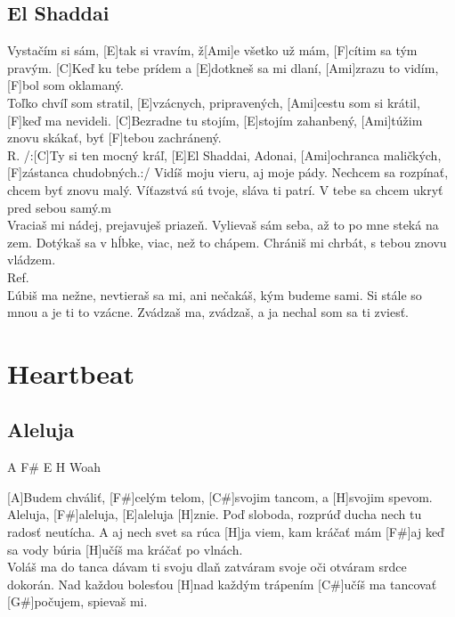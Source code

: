 \documentclass[10pt]{article}
\begin{document}
\begin{Large}
\begin{minipage}{\textwidth}
\subsection{El Shaddai}
\begin{multicols*}{2}
\begin{guitar}
	[C]Vystačím si sám, [E]tak si vravím,
	ž[Ami]e všetko už mám, [F]cítim sa tým pravým.
	[C]Keď ku tebe prídem a [E]dotkneš sa mi dlaní,
	[Ami]zrazu to vidím, [F]bol som oklamaný.
	\\
	[C]Toľko chvíľ som stratil, 
	[E]vzácnych, pripravených,
	[Ami]cestu som si krátil, [F]keď ma nevideli.
	[C]Bezradne tu stojím, [E]stojím zahanbený,
	[Ami]túžim znovu skákať, byť [F]tebou zachránený.
	\\
	R. /:[C]Ty si ten mocný kráľ,
	[E]El Shaddai, Adonai,
	[Ami]ochranca maličkých,
	[F]zástanca chudobných.:/
	\columnbreak
	Vidíš moju vieru, aj moje pády.
	Nechcem sa rozpínať, 
	chcem byť znovu malý.
	Víťazstvá sú tvoje, sláva ti patrí.
	V tebe sa chcem ukryť pred sebou samý.m
	\\
	Vraciaš mi nádej, prejavuješ priazeň.
	Vylievaš sám seba, 
	až to po mne steká na zem.
	Dotýkaš sa v hĺbke, viac, než to chápem.
	Chrániš mi chrbát, s tebou znovu vládzem.
	\\
	Ref.
	\\
	Ľúbiš ma nežne, nevtieraš sa mi,
	ani nečakáš, kým budeme sami.
	Si stále so mnou a je ti to vzácne.
	Zvádzaš ma, zvádzaš,
	a ja nechal som sa ti zviesť.
\end{guitar}
\end{multicols*}
\end{minipage}

\newpage

\begin{minipage}{\textwidth}
\section{Heartbeat}
\subsection{Aleluja}
\begin{multicols*}{3}
\begin{guitar}
	A F\# E H Woah
		
	[A]Budem chváliť, 
	[F#]celým telom,
	[C#]svojim tancom,
	a [H]svojim spevom.
	\\
	[A]Aleluja, [F#]aleluja, 
	[E]aleluja [H]znie.
	Poď sloboda, rozprúď ducha
	nech tu radosť neutícha.
	\columnbreak
	[F#]A aj nech svet sa rúca
	[H]ja viem, kam kráčať mám
	[F#]aj keď sa vody búria
	[H]učíš ma kráčať po vlnách.
	\\
	Voláš ma do tanca
	dávam ti svoju dlaň
	zatváram svoje oči
	otváram srdce dokorán.
	\columnbreak
	[A]Nad každou bolesťou
	[H]nad každým trápením
	[C#]učíš ma tancovať
	[G#]počujem, spievaš mi.
\end{guitar}
\end{multicols*}
\end{minipage}


\end{Large}
\end{document}
